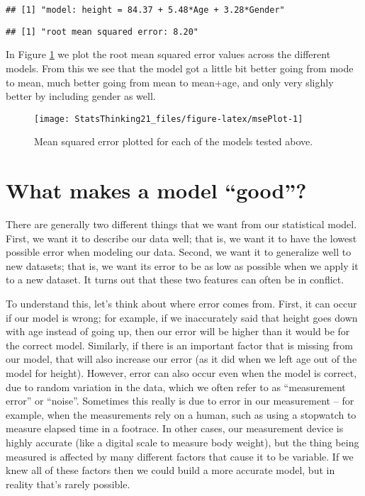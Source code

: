 \documentclass[]{book}
\newenvironment{Shaded}{\begin{snugshade}}{\end{snugshade}}
\newcommand{\KeywordTok}[1]{\textcolor[rgb]{0.13,0.29,0.53}{\textbf{#1}}}
\newcommand{\StringTok}[1]{\textcolor[rgb]{0.31,0.60,0.02}{#1}}
\newcommand{\NormalTok}[1]{#1}
\theoremstyle{definition}
\theoremstyle{definition}
\theoremstyle{definition}
\theoremstyle{remark}
\begin{document}
\begin{verbatim}
## [1] "model: height = 84.37 + 5.48*Age + 3.28*Gender"
\end{verbatim}

\begin{Shaded}
\end{Shaded}

\begin{verbatim}
## [1] "root mean squared error: 8.20"
\end{verbatim}

In Figure \ref{fig:msePlot} we plot the root mean squared error values
across the different models. From this we see that the model got a
little bit better going from mode to mean, much better going from mean
to mean+age, and only very slighly better by including gender as well.

\begin{figure}
\texttt{[image: StatsThinking21\_files/figure-latex/msePlot-1]} \caption{Mean squared error plotted for each of the models tested above.}\label{fig:msePlot}
\end{figure}

\section{\texorpdfstring{What makes a model
``good''?}{What makes a model good?}}\label{what-makes-a-model-good}

There are generally two different things that we want from our
statistical model. First, we want it to describe our data well; that is,
we want it to have the lowest possible error when modeling our data.
Second, we want it to generalize well to new datasets; that is, we want
its error to be as low as possible when we apply it to a new dataset. It
turns out that these two features can often be in conflict.

To understand this, let's think about where error comes from. First, it
can occur if our model is wrong; for example, if we inaccurately said
that height goes down with age instead of going up, then our error will
be higher than it would be for the correct model. Similarly, if there is
an important factor that is missing from our model, that will also
increase our error (as it did when we left age out of the model for
height). However, error can also occur even when the model is correct,
due to random variation in the data, which we often refer to as
``measurement error'' or ``noise''. Sometimes this really is due to
error in our measurement -- for example, when the measurements rely on a
human, such as using a stopwatch to measure elapsed time in a footrace.
In other cases, our measurement device is highly accurate (like a
digital scale to measure body weight), but the thing being measured is
affected by many different factors that cause it to be variable. If we
knew all of these factors then we could build a more accurate model, but
in reality that's rarely possible.
\end{document}

